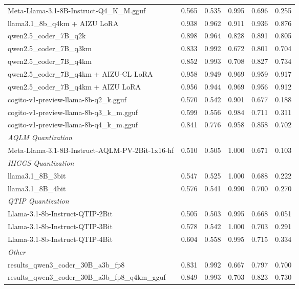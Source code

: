 \begin{table}[htbp]
{\begin{tabular}{lrrrrr}
    Meta-Llama-3.1-8B-Instruct-Q4\_K\_M.gguf & 0.565 & 0.535 & 0.995 & 0.696 & 0.255 \\
    llama3.1\_8b\_q4km + AIZU LoRA & 0.938 & 0.962 & 0.911 & 0.936 & 0.876 \\
    qwen2.5\_coder\_7B\_q2k & 0.898 & 0.964 & 0.828 & 0.891 & 0.805 \\
    qwen2.5\_coder\_7B\_q3km & 0.833 & 0.992 & 0.672 & 0.801 & 0.704 \\
    qwen2.5\_coder\_7B\_q4km & 0.852 & 0.993 & 0.708 & 0.827 & 0.734 \\
    qwen2.5\_coder\_7B\_q4km + AIZU-CL LoRA & 0.958 & 0.949 & 0.969 & 0.959 & \cellcolor{green!10}0.917 \\
    qwen2.5\_coder\_7B\_q4km + AIZU LoRA & 0.956 & 0.944 & 0.969 & 0.956 & 0.912 \\
    cogito-v1-preview-llama-8b-q2\_k.gguf & 0.570 & 0.542 & 0.901 & 0.677 & 0.188 \\
    cogito-v1-preview-llama-8b-q3\_k\_m.gguf & 0.599 & 0.556 & 0.984 & 0.711 & 0.311 \\
    cogito-v1-preview-llama-8b-q4\_k\_m.gguf & 0.841 & 0.776 & 0.958 & 0.858 & 0.702 \\
    \midrule
    \multicolumn{6}{l}{\textit{AQLM Quantization}} \\
    \midrule
    Meta-Llama-3.1-8B-Instruct-AQLM-PV-2Bit-1x16-hf & 0.510 & 0.505 & 1.000 & 0.671 & 0.103 \\
    \midrule
    \multicolumn{6}{l}{\textit{HIGGS Quantization}} \\
    \midrule
    llama3.1\_8B\_3bit & 0.547 & 0.525 & 1.000 & 0.688 & 0.222 \\
    llama3.1\_8B\_4bit & 0.576 & 0.541 & 0.990 & 0.700 & 0.270 \\
    \midrule
    \multicolumn{6}{l}{\textit{QTIP Quantization}} \\
    \midrule
    Llama-3.1-8b-Instruct-QTIP-2Bit & 0.505 & 0.503 & 0.995 & 0.668 & 0.051 \\
    Llama-3.1-8b-Instruct-QTIP-3Bit & 0.578 & 0.542 & 1.000 & 0.703 & 0.291 \\
    Llama-3.1-8b-Instruct-QTIP-4Bit & 0.604 & 0.558 & 0.995 & 0.715 & 0.334 \\
    \midrule
    \multicolumn{6}{l}{\textit{Other}} \\
    \midrule
    results\_qwen3\_coder\_30B\_a3b\_fp8 & 0.831 & 0.992 & 0.667 & 0.797 & 0.700 \\
    results\_qwen3\_coder\_30B\_a3b\_fp8\_q4km\_gguf & 0.849 & 0.993 & 0.703 & 0.823 & 0.730 \\
    \bottomrule
  \end{tabular}
  }
\end{table}

